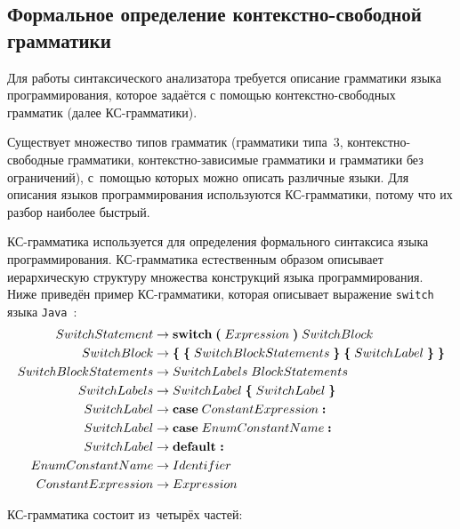 \subsection{Формальное определение контекстно-свободной грамматики} \label{sub114}

Для работы синтаксического анализатора требуется описание грамматики языка программирования, которое задаётся с помощью контекстно-свободных грамматик (далее КС-грамматики).

Существует множество типов грамматик (грамматики типа~3, контекстно-свободные грамматики, контекстно-зависимые грамматики и грамматики без ограничений), с~помощью которых можно описать различные языки. Для описания языков программирования используются КС-грамматики, потому что их разбор наиболее быстрый.

КС-грамматика используется для определения формального синтаксиса языка программирования. КС-грамматика естественным образом описывает иерархическую структуру множества конструкций языка программирования. Ниже приведён пример КС-грамматики, которая описывает выражение \texttt{switch} языка \texttt{Java}~\cite{web3}:
\begin{align*}
SwitchStatement &\to \textbf{switch}\;\textbf{(}\; Expression\; \textbf{)}\; SwitchBlock \\
SwitchBlock &\to \textbf{\{}\; \textbf{\{}\;SwitchBlockStatements\;\textbf{\}}\; \textbf{\{}\;SwitchLabel\;\textbf{\}}\; \textbf{\}} \\
SwitchBlockStatements &\to SwitchLabels\; BlockStatements \\
SwitchLabels &\to SwitchLabel\; \textbf{\{}\;SwitchLabel\;\textbf{\}} \\
SwitchLabel &\to \textbf{case}\; ConstantExpression\; \textbf{:} \\
SwitchLabel &\to \textbf{case}\; EnumConstantName \;\textbf{:} \\
SwitchLabel &\to \textbf{default\;:} \\
EnumConstantName &\to Identifier \\
ConstantExpression &\to Expression
\end{align*}

КС-грамматика состоит из~четырёх частей:
 
